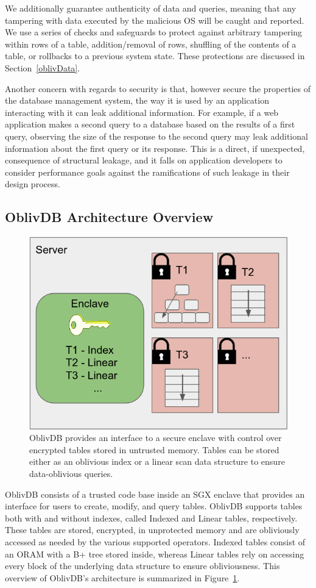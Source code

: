 \documentclass[letterpaper,twocolumn,10pt]{article}
\def\name/{OblivDB}
\begin{document}
We additionally guarantee authenticity of data and queries, meaning that any tampering with data executed by the malicious OS will be caught and reported. We use a series of checks and safeguards to protect against arbitrary tampering within rows of a table, addition/removal of rows, shuffling of the contents of a table, or rollbacks to a previous system state. These protections are discussed in Section~\ref{oblivData}.

Another concern with regards to security is that, however secure the properties of the database management system, the way it is used by an application interacting with it can leak additional information. For example, if a web application makes a second query to a database based on the results of a first query, observing the size of the response to the second query may leak additional information about the first query or its response. This is a direct, if unexpected, consequence of structural leakage, and it falls on application developers to consider performance goals against the ramifications of such leakage in their design process. 

\subsection{\name/ Architecture Overview}
\begin{figure}
\includegraphics[width=\linewidth]{figure_server.png}
\caption{\name/ provides an interface to a secure enclave with control over encrypted tables stored in untrusted memory. Tables can be stored either as an oblivious index or a linear scan data structure to ensure data-oblivious queries.}
\label{arch}
\end{figure}
\name/ consists of a trusted code base inside an SGX enclave that provides an interface for users to create, modify, and query tables. \name/ supports tables both with and without indexes, called Indexed and Linear tables, respectively. These tables are stored, encrypted, in unprotected memory and are obliviously accessed as needed by the various supported operators. Indexed tables consist of an ORAM with a B+ tree stored inside, whereas Linear tables rely on accessing every block of the underlying data structure to ensure obliviousness. This overview of \name/'s architecture is summarized in Figure~\ref{arch}.
\end{document}
